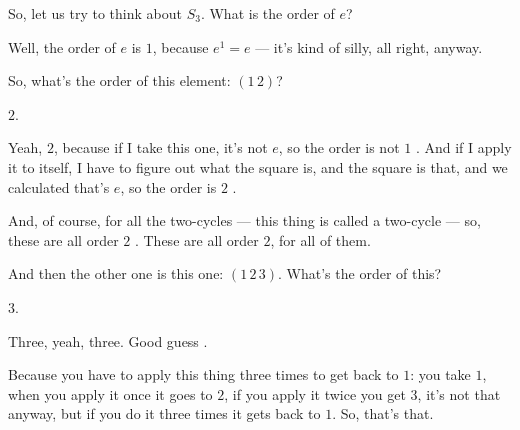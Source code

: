\begin{speech}[01:24:33 - 01:24:51]
So, let us try to think about $S_3$. What is the order of $e$? 

Well, the order of $e$ is $1$, because $e^1 = e$ --- it's kind of silly, all right, anyway.

So, what's the order of this element: $(1\,2)$? 
\end{speech}

\begin{student}
$2$.
\end{student}

\begin{speech}[01:24:52 - 01:25:17]
Yeah, $2$, because if I take this one, it's not $e$, so the order is not $1$ . And if I apply it to itself, I have to figure out what the square is, and the square is that, and we calculated that's $e$, so the order is $2$ .

And, of course, for all the two-cycles --- this thing is called a two-cycle --- so, these are all order $2$ . These are all order $2$, for all of them.

And then the other one is this one: $(1\,2\,3)$. What's the order of this? 
\end{speech}

\begin{student}
$3$.
\end{student}

\begin{speech}[01:25:18 - 01:25:43]
Three, yeah, three. Good guess .

Because you have to apply this thing three times to get back to $1$: you take $1$, when you apply it once it goes to $2$, if you apply it twice you get $3$, it's not that anyway, but if you do it three times it gets back to $1$. So, that's that.
\end{speech}

